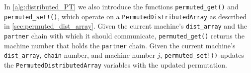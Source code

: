
\medskip 
In \cref{alg:distributed_PT} we also introduce the functions 
\texttt{permuted\_get()} and \texttt{permuted\_set!()}, which operate 
on a  \texttt{PermutedDistributedArray} as described  in \cref{sec:permuted_dist_array}.
Given the current machine's \texttt{dist\_array} and the 
\texttt{partner} chain with which it should communicate, 
\texttt{permuted\_get()} returns the machine number that holds the \texttt{partner} chain. 
Given the current machine's \texttt{dist\_array}, \texttt{chain} number, and machine number $j$,
\texttt{permuted\_set!()} updates the \texttt{PermutedDistributedArray} variables 
with the updated permutation.

